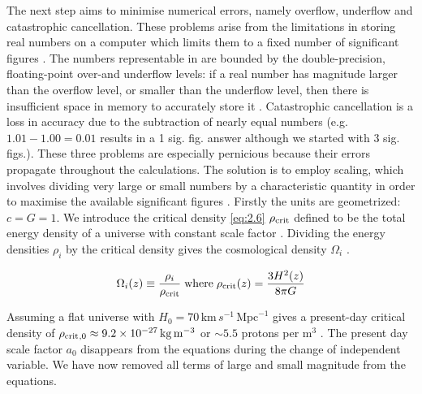 The next step aims to minimise numerical errors, namely overflow, underflow and catastrophic cancellation. These problems arise from the limitations in storing real numbers on a computer which limits them to a fixed number of significant figures \cite{Ivers2010}. The numbers representable in \matlab{} are bounded by the double-precision, floating-point over-and underflow levels: if a real number has magnitude larger than the overflow level, or smaller than the underflow level, then there is insufficient space in memory to accurately store it \cite{Ivers2010}. Catastrophic cancellation is a loss in accuracy due to the subtraction of nearly equal numbers (e.g. $1.01 - 1.00 = 0.01$ results in a 1 sig. fig. answer although we started with 3 sig. figs.). These three problems are especially pernicious because their errors propagate throughout the calculations. The solution is to employ scaling, which involves dividing very large or small numbers by a characteristic quantity in order to maximise the available significant figures \cite{Ivers2010}. Firstly the units are geometrized: $c = G = 1$. We introduce the critical density \cref{eq:2.6} $ \rho_{\mathrm{crit}} {}$ defined to be the total energy density of a universe with constant scale factor \cite{Hartle2003,Hobson2006}.  Dividing the energy densities $\rho_i$ by the critical density gives the cosmological density $\Omega_i$ \cite{Hobson2006,Olive2010}. 

\begin{equation}
    \Omega_{i}(z)
    \equiv{} \frac{\rho_{i}}{ \rho_{\mathrm{crit}} {}}
    \;\text{where}\;
     \rho_{\mathrm{crit}} {}(z) = \frac{3H^{2}(z)}{8\pi{}G} 
\label{eq:2.6}
\end{equation}

Assuming a flat universe with $H_0 = 70 \,\mathrm{km}\,s^{-1}\,\mathrm{Mpc}^{-1}$ gives a present-day critical density of $ \rho_{\mathrm{crit}} {}_{,0} \approx{} 9.2 \times 10^{-27} \,\mathrm{kg}\,\mathrm{m}^{-3}$ or $\sim 5.5$ protons per $\mathrm{m}^3$ \cite{Hartle2003}.  The present day scale factor $a_0$ disappears from the equations during the change of independent variable. We have now removed all terms of large and small magnitude from the equations. 

